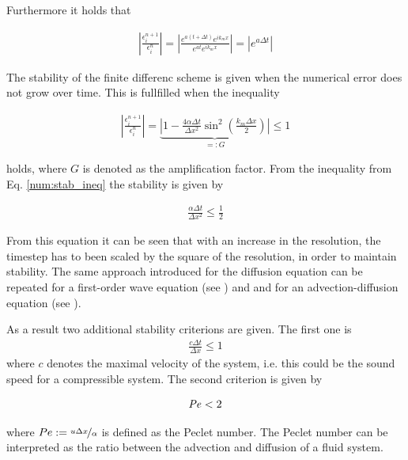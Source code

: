 Furthermore it holds that

\begin{align}
    \left|\frac{\epsilon_i^{n+1}}{\epsilon_i^n}\right| =
    \left|\frac{e^{a(t + \Delta t)}e^{ik_mx}}{ e^{at}e^{ik_m x}}\right| = \left|e^{a\Delta t}\right|
\end{align}

The stability of the finite differenc scheme is given when the numerical error does not grow over time. This is fullfilled when the inequality

\begin{align}
    \label{num:stab_ineq}
    \left|\frac{\epsilon_i^{n+1}}{\epsilon_i^n}\right| =
    \underbrace{\left|1 -  \frac{4\alpha \Delta t}{\Delta x^2} \sin^2\left(\frac{k_m \Delta x}{2}\right)\right|}_{=:G} \leq 1
\end{align}

holds, where $G$ is denoted as the amplification factor. From the inequality from Eq. \ref{num:stab_ineq}
the stability is given by

\begin{align}
   \frac{\alpha \Delta t}{\Delta x^2} \leq \frac{1}{2}
\end{align}

From this equation it can be seen that with an increase in the resolution, the timestep has to been scaled by the square of the resolution, in order to
maintain stability. The same approach introduced for the diffusion equation can be repeated for a first-order wave equation (see \citep{janderson}) and
and for an advection-diffusion equation (see \citep{ferziger99}).

As a result two additional stability criterions are given.
The first one is
\begin{align}
   \frac{c \Delta t}{\Delta x} \leq 1
\end{align}
where $c$ denotes the maximal velocity of the system, i.e. this could be the sound speed for a compressible system.
The second criterion is given by

\begin{align}
    \mbox{\textit{Pe}}  < 2
\end{align}

where $ Pe := \nicefrac{u \Delta x}{\alpha}$ is defined as the Peclet number.
The Peclet number can be interpreted as the ratio between the advection and diffusion of a fluid system.

